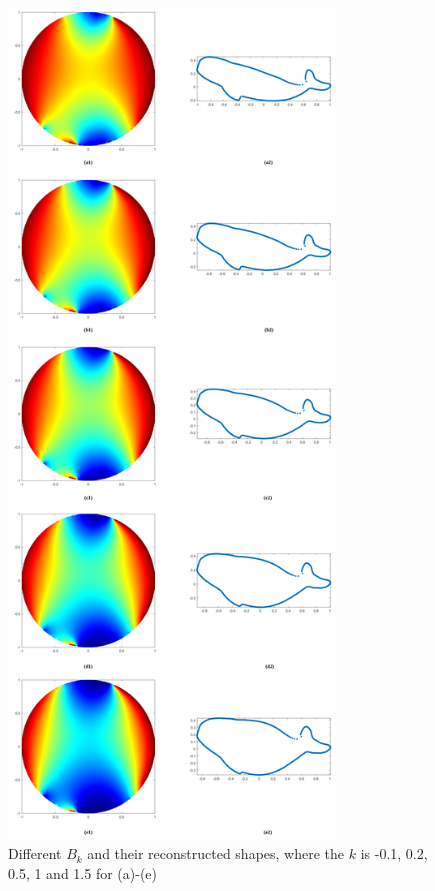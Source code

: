 \documentclass[review,onefignum,onetabnum]{siamonline190516}
\begin{document}
        \begin{figure}
            \begin{center}
                \includegraphics[height=22cm]{modify_HBS.png}
            \end{center}
            \caption{Different $B_k$ and their reconstructed shapes, where the $k$ is -0.1, 0.2, 0.5, 1 and 1.5 for (a)-(e)}
            \label{modify HBS}
        \end{figure}
\end{document}

